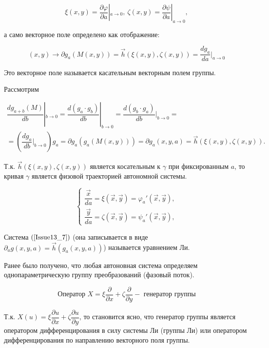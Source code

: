 \[ \xi(x,y) = \dfrac{\partial \varphi}{\partial a}|_{a \rightarrow 0},\ \zeta(x,y) = \dfrac{\partial \psi }{\partial a}|_{a \rightarrow 0}, \]

а само векторное поле определено как отображение:

\begin{equation}
	(x,y) \rightarrow \partial g_a(M(x,y)) = \vec{h}(\xi(x,y), \zeta(x,y)) = \dfrac{dg_a}{da}|_{a \rightarrow 0}
	\label{Issue13_6}
\end{equation}

Это векторное поле называется касательным векторным полем группы.

Рассмотрим 

\begin{equation}
	\begin{gathered}
		\dfrac{dg_{a+b}(M)}{db}|_{b\rightarrow 0} = \dfrac{d(g_a\cdot g_b)}{db}|_{b\rightarrow0} = \dfrac{d(g_b\cdot g_a)}{db}|_{b\rightarrow 0} = \\
		= (\dfrac{dg_a}{db}|_{b\rightarrow 0})g_a = \partial g_a (g_a(M(x,y))) = \partial g_a (x,y,a) = \vec{h}(\xi(x,y), \zeta(x,y)).
	\end{gathered}
\end{equation}

Т.к. $\vec{h}(\xi(x,y), \zeta(x,y))$ является косательным к $\gamma$ при фиксированным $a$, то кривая $\gamma$ является физовой траекторией автономной системы.

\begin{equation}
	\begin{cases}
		\dfrac{\vec{x}}{da} = \xi(\vec{x}, \vec{y}) = \varphi_a'(\vec{x}, \vec{y}), \\
		\dfrac{\vec{y}}{da} = \zeta(\vec{x}, \vec{y}) = \psi_a'(\vec{x}, \vec{y}),		
	\end{cases}
	\label{Issue13_7}
\end{equation}

Система $(\ref{Issue13_7})$ (она записывается в виде $\partial_a g(x,y,a) = \vec{h}(g_a(x,y,a))$) называется уравнением Ли.

Ранее было получено, что любая автоновная система определяем однопараметрическую группу преобразований (фазовый поток).


\begin{equation}
\text{Оператор } X = \xi \dfrac{\partial}{\partial x} + \zeta \dfrac{\partial}{\partial y} - \text{ генератор группы}
\label{Issue13_8}
\end{equation}

Т.к. $X(u) = \xi \dfrac{\partial u}{\partial x} + \zeta \dfrac{\partial u}{\partial y}$, то становится ясно, что генератор группы является оператором дифференцирования в силу системы Ли (группы Ли) или оператором дифференцирования по направлению векторного поля группы.

